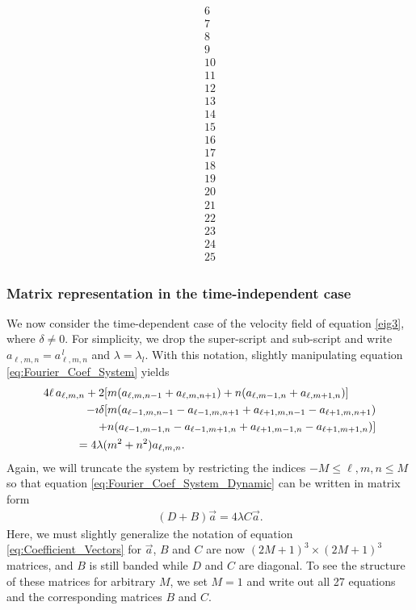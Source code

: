 \documentclass{article}
\newcommand{\0}{\mathbf{0}}
\newcommand{\1}{\mathbf{1}}
\newcommand{\2}{\mathbf{2}}
\newcommand{\3}{\mathbf{3}}
\newcommand{\4}{\mathbf{4}}
\newcommand{\5}{\mathbf{5}}
\newcommand{\6}{\mathbf{6}}
\newcommand{\7}{\mathbf{7}}
\newcommand{\8}{\mathbf{8}}
\begin{document}
\begin{small}
\begin{align*}
\begin{array}{c}
    6\\7\\8\\9\\10\\
    11\\12\\13\\14\\15\\
    16\\17\\18\\19\\20\\
    21\\22\\23\\24\\25
  \end{array}
\end{align*}
\end{small}  
\subsubsection{Matrix representation in the time-independent case}
%
We now consider the time-dependent case of the velocity field of
equation \eqref{eig3}, where $\delta\neq0$. For simplicity, we drop the
super-script and sub-script and write $a_{\ell,m,n}=a^{\,l}_{\ell,m,n}$ and
$\lambda=\lambda_l$. With this notation, slightly manipulating equation
\eqref{eq:Fourier_Coef_System} yields
%
\begin{align}\label{eq:Fourier_Coef_System_Dynamic}
4\ell\,a_{\ell,m,n}
+2[&m(a_{\ell,m,n-1}+a_{\ell,m,n+1})+n(a_{\ell,m-1,n}+a_{\ell,m+1,n})]
\notag\\
-\imath\delta[&m(a_{\ell-1,m,n-1}-a_{\ell-1,m,n+1}+a_{\ell+1,m,n-1}-a_{\ell+1,m,n+1})\notag\\
    +&n(a_{\ell-1,m-1,n}-a_{\ell-1,m+1,n}+a_{\ell+1,m-1,n}-a_{\ell+1,m+1,n})] 
\notag\\
=4\lambda(&m^2+n^2)a_{\ell,m,n}.
\end{align}
%
Again, we will truncate the system by restricting the indices
$-M\leq\ell,m,n\leq M$ so that equation \eqref{eq:Fourier_Coef_System_Dynamic} can
be written in matrix form 
%
\begin{align}
  (D+B)\vec{a}=4\lambda C\vec{a}.
\end{align}
%
Here, we must slightly generalize the notation of equation
\eqref{eq:Coefficient_Vectors} for $\vec{a}$, $B$ and $C$ are now 
$(2M+1)^3\times(2M+1)^3$ matrices, and $B$ is still banded while $D$ and
$C$ are diagonal. To see the structure of these matrices
for arbitrary $M$, we set $M=1$ and write out all 27 equations and the
corresponding matrices $B$ and $C$.       
\end{document}
